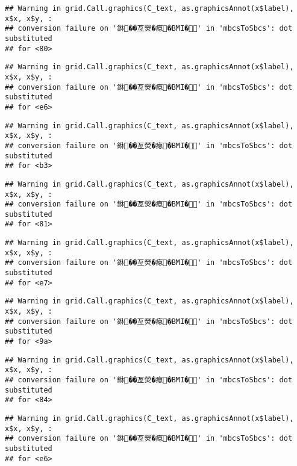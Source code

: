 \documentclass[
]{article}
\begin{document}
\begin{verbatim}
## Warning in grid.Call.graphics(C_text, as.graphicsAnnot(x$label), x$x, x$y, :
## conversion failure on '銝��亙熒�瘜�BMI�' in 'mbcsToSbcs': dot substituted
## for <80>
\end{verbatim}

\begin{verbatim}
## Warning in grid.Call.graphics(C_text, as.graphicsAnnot(x$label), x$x, x$y, :
## conversion failure on '銝��亙熒�瘜�BMI�' in 'mbcsToSbcs': dot substituted
## for <e6>
\end{verbatim}

\begin{verbatim}
## Warning in grid.Call.graphics(C_text, as.graphicsAnnot(x$label), x$x, x$y, :
## conversion failure on '銝��亙熒�瘜�BMI�' in 'mbcsToSbcs': dot substituted
## for <b3>
\end{verbatim}

\begin{verbatim}
## Warning in grid.Call.graphics(C_text, as.graphicsAnnot(x$label), x$x, x$y, :
## conversion failure on '銝��亙熒�瘜�BMI�' in 'mbcsToSbcs': dot substituted
## for <81>
\end{verbatim}

\begin{verbatim}
## Warning in grid.Call.graphics(C_text, as.graphicsAnnot(x$label), x$x, x$y, :
## conversion failure on '銝��亙熒�瘜�BMI�' in 'mbcsToSbcs': dot substituted
## for <e7>
\end{verbatim}

\begin{verbatim}
## Warning in grid.Call.graphics(C_text, as.graphicsAnnot(x$label), x$x, x$y, :
## conversion failure on '銝��亙熒�瘜�BMI�' in 'mbcsToSbcs': dot substituted
## for <9a>
\end{verbatim}

\begin{verbatim}
## Warning in grid.Call.graphics(C_text, as.graphicsAnnot(x$label), x$x, x$y, :
## conversion failure on '銝��亙熒�瘜�BMI�' in 'mbcsToSbcs': dot substituted
## for <84>
\end{verbatim}

\begin{verbatim}
## Warning in grid.Call.graphics(C_text, as.graphicsAnnot(x$label), x$x, x$y, :
## conversion failure on '銝��亙熒�瘜�BMI�' in 'mbcsToSbcs': dot substituted
## for <e6>
\end{verbatim}
\end{document}

